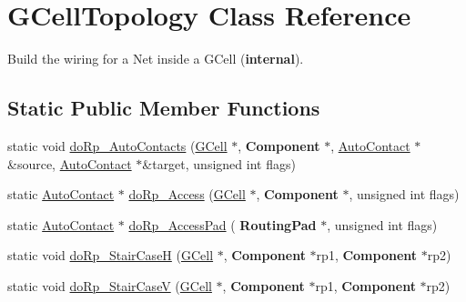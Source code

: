 \hypertarget{classanonymous__namespace_02LoadGrByNet_8cpp_03_1_1GCellTopology}{}\section{G\+Cell\+Topology Class Reference}
\label{classanonymous__namespace_02LoadGrByNet_8cpp_03_1_1GCellTopology}


Build the wiring for a Net inside a G\+Cell ({\bfseries internal}).  


\subsection*{Static Public Member Functions}
\begin{DoxyCompactItemize}
\item 
static void \hyperlink{group__LoadGlobalRouting_gae9cae408ea16a3f7c77c3d75f0242f19}{do\+Rp\+\_\+\+Auto\+Contacts} (\hyperlink{classKatabatic_1_1GCell}{G\+Cell} $\ast$, \textbf{ Component} $\ast$, \hyperlink{classKatabatic_1_1AutoContact}{Auto\+Contact} $\ast$\&source, \hyperlink{classKatabatic_1_1AutoContact}{Auto\+Contact} $\ast$\&target, unsigned int flags)
\item 
static \hyperlink{classKatabatic_1_1AutoContact}{Auto\+Contact} $\ast$ \hyperlink{group__LoadGlobalRouting_gada6d3c694b8d741b6504b7c3da166357}{do\+Rp\+\_\+\+Access} (\hyperlink{classKatabatic_1_1GCell}{G\+Cell} $\ast$, \textbf{ Component} $\ast$, unsigned int flags)
\item 
static \hyperlink{classKatabatic_1_1AutoContact}{Auto\+Contact} $\ast$ \hyperlink{group__LoadGlobalRouting_ga60edeea78b56db072fc26a58a7afbcd4}{do\+Rp\+\_\+\+Access\+Pad} (\textbf{ Routing\+Pad} $\ast$, unsigned int flags)
\item 
static void \hyperlink{group__LoadGlobalRouting_ga3291d84592215974fe4052c00304bdb1}{do\+Rp\+\_\+\+Stair\+CaseH} (\hyperlink{classKatabatic_1_1GCell}{G\+Cell} $\ast$, \textbf{ Component} $\ast$rp1, \textbf{ Component} $\ast$rp2)
\item 
static void \hyperlink{group__LoadGlobalRouting_ga6361fb0e90f35cd59063a1ee971ef2a9}{do\+Rp\+\_\+\+Stair\+CaseV} (\hyperlink{classKatabatic_1_1GCell}{G\+Cell} $\ast$, \textbf{ Component} $\ast$rp1, \textbf{ Component} $\ast$rp2)
\end{DoxyCompactItemize}
